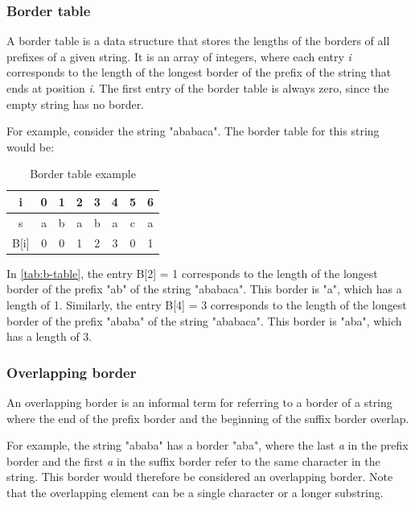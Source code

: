 \documentclass{l4proj}
\begin{document}
\subsubsection{Border table}

 A border table is a data structure that stores the lengths of the borders of all prefixes of a given string. It is an array of integers, where each entry \emph{i} corresponds to the length of the longest border of the prefix of the string that ends at position \emph{i}. The first entry of the border table is always zero, since the empty string has no border.

For example, consider the string "ababaca". The border table for this string would be:

\begin{table}[!h]
\begin{center}
\begin{tabular}{|c||c|c|c|c|c|c|c|}
	\hline
	i & 0 & 1 & 2 & 3 & 4 & 5 & 6 \\
	\hline
	s & a & b & a & b & a & c & a \\
	\hline
	B[i] & 0 & 0 & 1 & 2 & 3 & 0 & 1 \\ 
	\hline
\end{tabular}
\caption{\label{tab:b-table}Border table example}
\end{center}
\end{table}


In \autoref{tab:b-table}, the entry B[2] = 1 corresponds to the length of the longest border of the prefix "ab" of the string "ababaca". This border is "a", which has a length of 1. Similarly, the entry B[4] = 3 corresponds to the length of the longest border of the prefix "ababa" of the string "ababaca". This border is "aba", which has a length of 3.

\subsubsection{Overlapping border}
An overlapping border is an informal term for referring to a border of a string where the end of the prefix border and the beginning of the suffix border overlap.

For example, the string "ababa" has a border "aba", where the last \emph{a} in the prefix border and the first \emph{a} in the suffix border refer to the same character in the string. This border would therefore be considered an overlapping border. Note that the overlapping element can be a single character or a longer substring.
\end{document}
